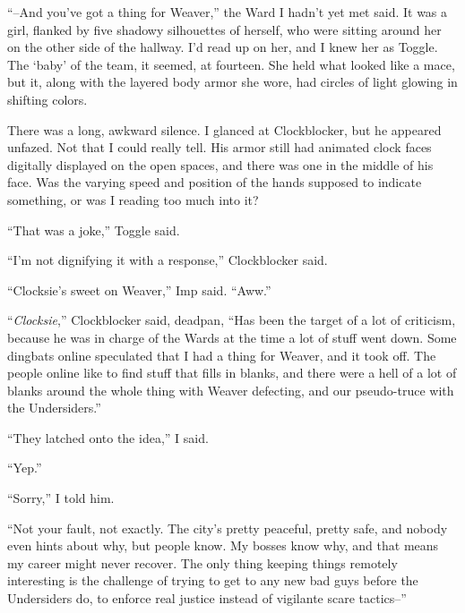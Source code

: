 ``--And you've got a thing for Weaver,'' the Ward I hadn't yet met said.  It was a girl, flanked by five shadowy silhouettes of herself, who were sitting around her on the other side of the hallway.  I'd read up on her, and I knew her as Toggle.  The `baby' of the team, it seemed, at fourteen.  She held what looked like a mace, but it, along with the layered body armor she wore, had circles of light glowing in shifting colors.



There was a long, awkward silence.  I glanced at Clockblocker, but he appeared unfazed.  Not that I could really tell.  His armor still had animated clock faces digitally displayed on the open spaces, and there was one in the middle of his face.  Was the varying speed and position of the hands supposed to indicate something, or was I reading too much into it?



``That was a joke,'' Toggle said.



``I'm not dignifying it with a response,'' Clockblocker said.



``Clocksie's sweet on Weaver,'' Imp said.  ``Aww.''



``\emph{Clocksie},'' Clockblocker said, deadpan, ``Has been the target of a lot of criticism, because he was in charge of the Wards at the time a lot of stuff went down.  Some dingbats online speculated that I had a thing for Weaver, and it took off.  The people online like to find stuff that fills in blanks, and there were a hell of a lot of blanks around the whole thing with Weaver defecting, and our pseudo-truce with the Undersiders.''



``They latched onto the idea,'' I said.



``Yep.''



``Sorry,'' I told him.



``Not your fault, not exactly.  The city's pretty peaceful, pretty safe, and nobody even hints about why, but people know.  My bosses know why, and that means my career might never recover.  The only thing keeping things remotely interesting is the challenge of trying to get to any new bad guys before the Undersiders do, to enforce real justice instead of vigilante scare tactics--''



